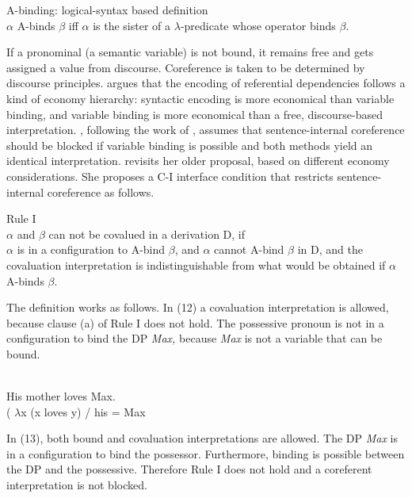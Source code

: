 \documentclass[output=paper]{langsci/langscibook}
\begin{document}
\ea%
    \label{ex:wein:10}
    A-binding: logical-syntax based definition \citep[171]{Reinhart2006}\\
    $\alpha $ A-binds $\beta $ iff $\alpha $ is the sister of a $\lambda $-predicate whose operator binds $\beta $.
\z

If a pronominal (a semantic variable) is not bound, it remains free and gets assigned a value from discourse. Coreference is taken to be determined by discourse principles. \citet{Reuland2011} argues that the encoding of referential dependencies follows a kind of economy hierarchy: syntactic encoding is more economical than variable binding, and variable binding is more economical than a free, discourse-based interpretation. \citet{Reuland2011}, following the work of \citet{Reinhart1983}, assumes that sentence-internal coreference should be blocked if variable binding is possible and both methods yield an identical interpretation. \citet{Reinhart2006} revisits her older proposal, based on different economy considerations. She proposes a C-I interface condition that restricts sentence-internal coreference as follows.

\ea%
    Rule I \citep[185]{Reinhart2006}\\
$\alpha $ and $\beta $ can not be covalued in a derivation D, if\\\label{ex:wein:11}
    \ea $\alpha $ is in a configuration to A-bind $\beta $, and
    \ex $\alpha $ cannot A-bind $\beta $ in D, and
    \ex the covaluation interpretation is indistinguishable from what would be obtained if $\alpha $ A-binds $\beta $.
    \z
\z

The definition works as follows. In (12) a covaluation interpretation is allowed, because clause (a) of Rule I does not hold. The possessive pronoun is not in a configuration to bind the DP \textit{Max,} because \textit{Max} is not a variable that can be bound.

\ea%
    \citep[186]{Reinhart2006}\\\label{ex:wein:12}
    His mother loves Max.\\ ( $\lambda $x (x loves y) / his = Max\\
\z

In (13), both bound and covaluation interpretations are allowed. The DP \textit{Max} is in a configuration to bind the possessor. Furthermore, binding is possible between the DP and the possessive. Therefore Rule I does not hold and a coreferent interpretation is not blocked.
\end{document}
